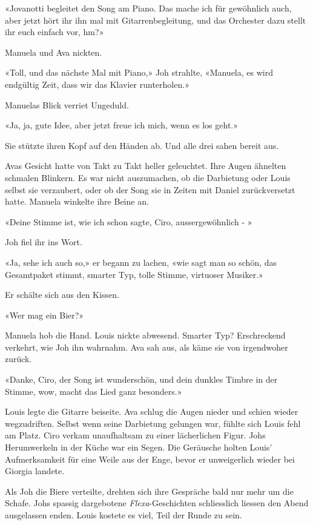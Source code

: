 «Jovanotti begleitet den Song am Piano. Das mache ich für gewöhnlich
auch, aber jetzt hört ihr ihn mal mit Gitarrenbegleitung, und das
Orchester dazu stellt ihr euch einfach vor, hm?»

Manuela und Ava nickten.

«Toll, und das nächste Mal mit Piano,» Joh strahlte, «Manuela, es wird
endgültig Zeit, dass wir das Klavier runterholen.»

Manuelas Blick verriet Ungeduld.

«Ja, ja, gute Idee, aber jetzt freue ich mich, wenn es los geht.»

Sie stützte ihren Kopf auf den Händen ab. Und alle drei sahen bereit
aus.


Avas Gesicht hatte von Takt zu Takt heller geleuchtet. Ihre Augen
ähnelten schmalen Blinkern. Es war nicht auszumachen, ob die Darbietung oder Louis selbst sie verzaubert, oder ob der Song sie in Zeiten mit Daniel zurückversetzt hatte.
Manuela winkelte ihre Beine an.

«Deine Stimme ist, wie ich schon sagte, Ciro, aussergewöhnlich - »

Joh fiel ihr ins Wort.

«Ja, sehe ich auch so,» er begann zu lachen, «wie sagt man so schön, das
Gesamtpaket stimmt, smarter Typ, tolle Stimme, virtuoser Musiker.»

Er schälte sich aus den Kissen.

«Wer mag ein Bier?»

Manuela hob die Hand. Louis nickte abwesend. Smarter Typ? Erschreckend verkehrt, wie Joh ihn wahrnahm. 
Ava sah aus, als käme sie von irgendwoher zurück.

«Danke, Ciro, der Song ist wunderschön, und dein dunkles Timbre in der
Stimme, wow, macht das Lied ganz besonders.»

Louis legte die Gitarre beiseite. Ava schlug die Augen nieder und schien wieder wegzudriften.
Selbst wenn seine Darbietung gelungen war, fühlte sich Louis fehl am Platz. Ciro verkam unaufhaltsam zu einer lächerlichen Figur. 
Johs Herumwerkeln in der Küche war ein Segen. Die Geräusche holten Louis’ 
Aufmerksamkeit für eine Weile aus der Enge, bevor er unweigerlich wieder bei Giorgia landete. 

Als Joh die Biere verteilte, drehten sich ihre Gespräche bald nur mehr um die Schafe. Johs spassig
dargebotene \emph{Flexa}-Geschichten schliesslich liessen den Abend
ausgelassen enden. Louis kostete es viel, Teil der Runde zu sein. 
